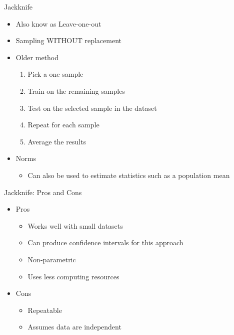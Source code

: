 \documentclass[aspectratio=169]{beamer}
\begin{document}
\begin{frame}[fragile]{Jackknife}

\begin{itemize}
\item Also know as Leave-one-out 
\item Sampling WITHOUT replacement
\item Older method
\begin{enumerate}
\item Pick a one sample
\item Train on the remaining samples
\item Test on the selected sample in the dataset
\item Repeat for each sample
\item Average the results
\end{enumerate}
\item Norms
\begin{itemize}
\item Can also be used to estimate statistics such as a population mean
\end{itemize}
\end{itemize}
	

\end{frame}
\begin{frame}[fragile]{Jackknife: Pros and Cons}

\begin{itemize}
\item Pros
\begin{itemize}
\item Works well with small datasets
\item Can produce confidence intervals for this approach
\item Non-parametric
\item Uses less computing resources
\end{itemize}

\item Cons
\begin{itemize}
\item Repeatable
\item Assumes data are independent
\end{itemize}
\end{itemize}


\end{frame}
\end{document}
